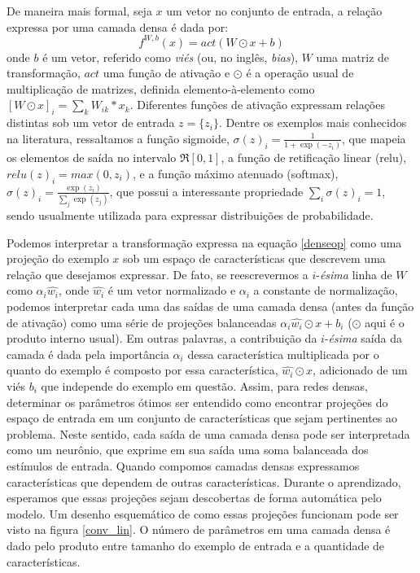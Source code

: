 De maneira mais formal, seja $x$ um vetor no conjunto de entrada, a relação expressa por uma camada densa é dada por:
\begin{equation}\label{denseop}
f^{W,b}(x) = act(W \odot x + b)
\end{equation}
onde $b$ é um vetor, referido como \textit{viés} (ou, no inglês, \textit{bias}), $W$ uma matriz de transformação, $act$ uma função de ativação e $\odot$ é a operação usual de multiplicação de matrizes, definida elemento-à-elemento como $[W \odot x]_{i} = \sum_k W_{ik} * x_k$. Diferentes funções de ativação expressam relações distintas sob um vetor de entrada $z = \{z_i\}$. Dentre os exemplos mais conhecidos na literatura, ressaltamos a função sigmoide, $\sigma(z)_i = \frac{1}{1+\exp(-z_i)}$, que mapeia os elementos de saída no intervalo $\Re[0,1]$, a função de retificação linear (relu), $relu(z)_i = max(0, z_i)$, e a função máximo atenuado (softmax), $\sigma(z)_i = \frac{\exp(z_i)}{\sum_j \exp(z_j)}$, que possui a interessante propriedade $\sum_i \sigma(z)_i = 1$, sendo usualmente utilizada para expressar distribuições de probabilidade.

Podemos interpretar a transformação expressa na equação \ref{denseop} como uma projeção do exemplo $x$ sob um espaço de características que descrevem uma relação que desejamos expressar. De fato, se reescrevermos a $i$-\textit{ésima} linha de $W$ como $\alpha_i \hat{w_i}$, onde $\hat{w_i}$ é um vetor normalizado e $\alpha_i$ a constante de normalização, podemos interpretar cada uma das saídas de uma camada densa (antes da função de ativação) como uma série de projeções balanceadas $\alpha_i \hat{w_i} \odot x + b_i$ ($\odot$ aqui é o produto interno usual). Em outras palavras, a contribuição da $i$-\textit{ésima} saída da camada é dada pela importância $\alpha_i$ dessa característica multiplicada por o quanto do exemplo é composto por essa característica,  $\hat{w_i} \odot x$, adicionado de um viés $b_i$ que independe do exemplo em questão. Assim, para redes densas, determinar os parâmetros ótimos ser entendido como encontrar projeções do espaço de entrada em um conjunto de características que sejam pertinentes ao problema. Neste sentido, cada saída de uma camada densa pode ser interpretada como um neurônio, que exprime em sua saída uma soma balanceada dos estímulos de entrada. Quando compomos camadas densas expressamos características que dependem de outras características. Durante o aprendizado, esperamos que essas projeções sejam descobertas de forma automática pelo modelo. Um desenho esquemático de como essas projeções funcionam pode ser visto na figura \ref{conv_lin}. O número de parâmetros em uma camada densa é dado pelo produto entre tamanho do exemplo de entrada e a quantidade de características.

